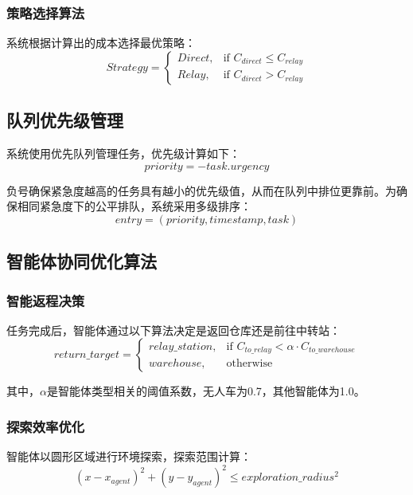 \documentclass[12pt,a4paper]{article}
\begin{document}
\subsubsection{策略选择算法}
系统根据计算出的成本选择最优策略：
\begin{equation}
Strategy = 
\begin{cases}
Direct, & \text{if } C_{direct} \leq C_{relay} \\
Relay, & \text{if } C_{direct} > C_{relay}
\end{cases}
\end{equation}

\subsection{队列优先级管理}

系统使用优先队列管理任务，优先级计算如下：
\begin{equation}
priority = -task.urgency
\end{equation}

负号确保紧急度越高的任务具有越小的优先级值，从而在队列中排位更靠前。为确保相同紧急度下的公平排队，系统采用多级排序：
\begin{equation}
entry = (priority, timestamp, task)
\end{equation}

\subsection{智能体协同优化算法}

\subsubsection{智能返程决策}
任务完成后，智能体通过以下算法决定是返回仓库还是前往中转站：
\begin{equation}
return\_target = 
\begin{cases}
relay\_station, & \text{if } C_{to\_relay} < \alpha \cdot C_{to\_warehouse} \\
warehouse, & \text{otherwise}
\end{cases}
\end{equation}

其中，$\alpha$是智能体类型相关的阈值系数，无人车为0.7，其他智能体为1.0。

\subsubsection{探索效率优化}
智能体以圆形区域进行环境探索，探索范围计算：
\begin{equation}
(x - x_{agent})^2 + (y - y_{agent})^2 \leq exploration\_radius^2
\end{equation}
\end{document}
